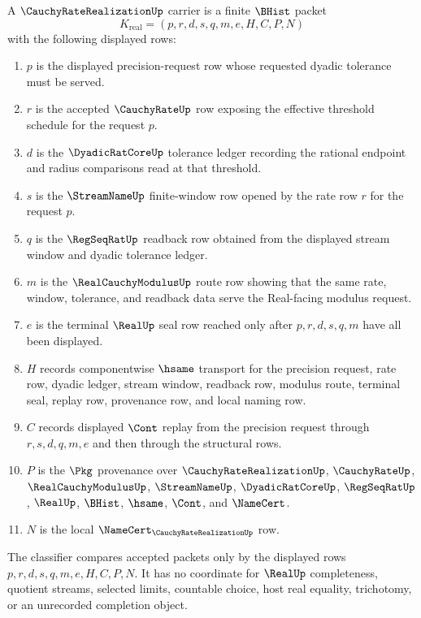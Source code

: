 \begin{definition}
\label{def:cauchy-rate-realization-carrier}
A $\CauchyRateRealizationUp$ carrier is a finite $\BHist$ packet
$$
K_{\mathrm{real}}=(p,r,d,s,q,m,e,H,C,P,N)
$$
with the following displayed rows:
\begin{enumerate}
\item $p$ is the displayed precision-request row whose requested dyadic tolerance must be served.
\item $r$ is the accepted $\CauchyRateUp$ row exposing the effective threshold schedule for the request $p$.
\item $d$ is the $\DyadicRatCoreUp$ tolerance ledger recording the rational endpoint and radius comparisons read at that threshold.
\item $s$ is the $\StreamNameUp$ finite-window row opened by the rate row $r$ for the request $p$.
\item $q$ is the $\RegSeqRatUp$ readback row obtained from the displayed stream window and dyadic tolerance ledger.
\item $m$ is the $\RealCauchyModulusUp$ route row showing that the same rate, window, tolerance, and readback data serve the Real-facing modulus request.
\item $e$ is the terminal $\RealUp$ seal row reached only after $p,r,d,s,q,m$ have all been displayed.
\item $H$ records componentwise $\hsame$ transport for the precision request, rate row, dyadic ledger, stream window, readback row, modulus route, terminal seal, replay row, provenance row, and local naming row.
\item $C$ records displayed $\Cont$ replay from the precision request through $r,s,d,q,m,e$ and then through the structural rows.
\item $P$ is the $\Pkg$ provenance over $\CauchyRateRealizationUp$, $\CauchyRateUp$, $\RealCauchyModulusUp$, $\StreamNameUp$, $\DyadicRatCoreUp$, $\RegSeqRatUp$, $\RealUp$, $\BHist$, $\hsame$, $\Cont$, and $\NameCert$.
\item $N$ is the local $\NameCert_{\CauchyRateRealizationUp}$ row.
\end{enumerate}
The classifier compares accepted packets only by the displayed rows $p,r,d,s,q,m,e,H,C,P,N$. It has no coordinate for $\RealUp$ completeness, quotient streams, selected limits, countable choice, host real equality, trichotomy, or an unrecorded completion object.
\end{definition}

